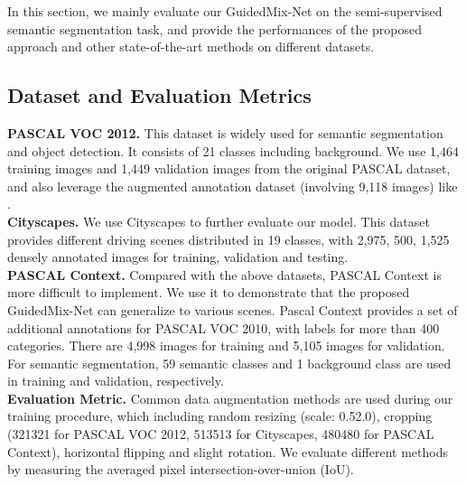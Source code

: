 In this section, we mainly evaluate our GuidedMix-Net on the semi-supervised semantic segmentation task, and provide the performances of the proposed approach and other state-of-the-art methods on different datasets.

\subsection{Dataset and Evaluation Metrics}
\textbf{PASCAL VOC 2012.} This dataset is widely used for semantic segmentation and object detection.
It consists of 21 classes including background.
We use 1,464 training images and 1,449 validation images from the original PASCAL dataset, and also leverage the augmented annotation dataset (involving 9,118 images) \cite{Hariharan2011Semantic} like \cite{2018Weakly,zhao2017pyramid}.
\\\textbf{Cityscapes.} We use Cityscapes to further evaluate our model. 
This dataset provides different driving scenes distributed in 19 classes, with 2,975, 500, 1,525 densely annotated images for training, validation and testing.
\\\textbf{PASCAL Context.} Compared with the above datasets, PASCAL Context is more difficult to implement. 
We use it to demonstrate that the proposed GuidedMix-Net can generalize to various scenes.
Pascal Context provides a set of additional annotations for PASCAL VOC 2010, with labels for more than 400 categories.
There are 4,998 images for training and 5,105 images for validation.
For semantic segmentation, 59 semantic classes and 1 background class are used in training and validation, respectively.
\\\textbf{Evaluation Metric.} Common data augmentation methods are used during our training procedure, which including random resizing (scale: 0.52.0), cropping (321321 for PASCAL VOC 2012, 513513 for Cityscapes, 480480 for PASCAL Context), horizontal flipping and slight rotation. 
We evaluate different methods by measuring the averaged pixel intersection-over-union (IoU).

